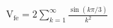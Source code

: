 \documentclass[preview]{standalone}
\begin{document}
\begin{align*}
\mathrm{V}_{\mathrm{fe}}=2\sum_{k=1}^{\infty}\frac{\sin\!\left(k\pi/3\right)}{k^2}
\end{align*}
\end{document}
